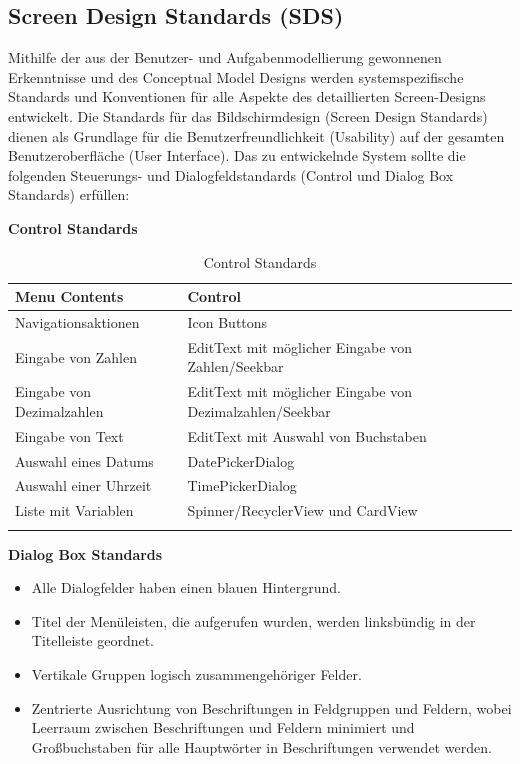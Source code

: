\subsection{Screen Design Standards (SDS)}
Mithilfe der aus der Benutzer- und Aufgabenmodellierung gewonnenen Erkenntnisse und des Conceptual Model Designs werden systemspezifische Standards und Konventionen für alle Aspekte des detaillierten Screen-Designs entwickelt. Die Standards für das Bildschirmdesign (Screen Design Standards) dienen als Grundlage für die Benutzerfreundlichkeit (Usability) auf der gesamten Benutzeroberfläche (User Interface). Das zu entwickelnde System sollte die folgenden Steuerungs- und Dialogfeldstandards (Control und Dialog Box Standards) erfüllen:\\
\centerline{\textbf{Control Standards}}
\begin{center}
	\begin{longtable}[H]{p{8cm}p{6cm}}
		\textbf{Menu Contents} & \textbf{Control}\\
		\toprule
		Navigationsaktionen & Icon Buttons\\
		Eingabe von Zahlen & EditText mit möglicher Eingabe von Zahlen/Seekbar\\
		Eingabe von Dezimalzahlen & EditText mit möglicher Eingabe von Dezimalzahlen/Seekbar\\
		Eingabe von Text & EditText mit Auswahl von Buchstaben\\
		Auswahl eines Datums & DatePickerDialog\\
		Auswahl einer Uhrzeit & TimePickerDialog\\
		Liste mit Variablen & Spinner/RecyclerView und CardView\\
		\bottomrule
		\captionsetup{justification=centering}
		\caption{Control Standards}
		\label{tab:controlstandars}
	\end{longtable}
\end{center}
\centerline{\textbf{Dialog Box Standards}}
\begin{itemize}
	\item Alle Dialogfelder haben einen blauen Hintergrund.
	\item Titel der Menüleisten, die aufgerufen wurden, werden linksbündig in der Titelleiste geordnet.
	\item Vertikale Gruppen logisch zusammengehöriger Felder.
	\item Zentrierte Ausrichtung von Beschriftungen in Feldgruppen und Feldern, wobei Leerraum zwischen Beschriftungen und Feldern minimiert und Großbuchstaben für alle Hauptwörter in Beschriftungen verwendet werden.
\end{itemize}
